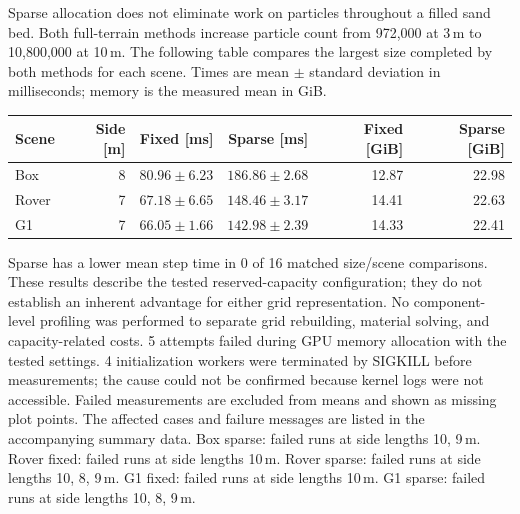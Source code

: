 Sparse allocation does not eliminate work on particles throughout a filled sand bed. Both full-terrain methods increase particle count from 972,000 at 3\,m to 10,800,000 at 10\,m. The following table compares the largest size completed by both methods for each scene. Times are mean $\pm$ standard deviation in milliseconds; memory is the measured mean in GiB.
\begin{center}\small\begin{tabular}{lrrrrr}\toprule
Scene & Side [m] & Fixed [ms] & Sparse [ms] & Fixed [GiB] & Sparse [GiB] \\\midrule
Box & 8 & $80.96\pm6.23$ & $186.86\pm2.68$ & 12.87 & 22.98 \\
Rover & 7 & $67.18\pm6.65$ & $148.46\pm3.17$ & 14.41 & 22.63 \\
G1 & 7 & $66.05\pm1.66$ & $142.98\pm2.39$ & 14.33 & 22.41 \\
\bottomrule\end{tabular}\end{center}
Sparse has a lower mean step time in 0 of 16 matched size/scene comparisons. These results describe the tested reserved-capacity configuration; they do not establish an inherent advantage for either grid representation. No component-level profiling was performed to separate grid rebuilding, material solving, and capacity-related costs.
5 attempts failed during GPU memory allocation with the tested settings.
4 initialization workers were terminated by SIGKILL before measurements; the cause could not be confirmed because kernel logs were not accessible.
Failed measurements are excluded from means and shown as missing plot points. The affected cases and failure messages are listed in the accompanying summary data.
Box sparse: failed runs at side lengths 10, 9\,m.
Rover fixed: failed runs at side lengths 10\,m.
Rover sparse: failed runs at side lengths 10, 8, 9\,m.
G1 fixed: failed runs at side lengths 10\,m.
G1 sparse: failed runs at side lengths 10, 8, 9\,m.

